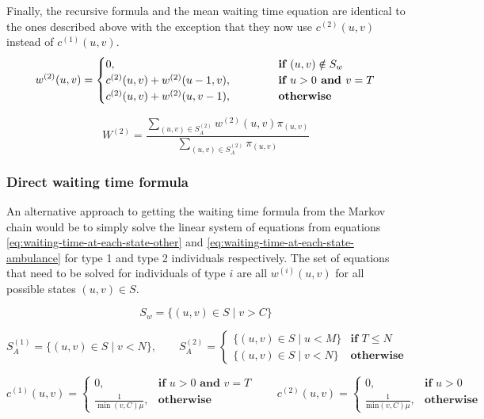 Finally, the recursive formula and the mean waiting time equation are identical 
to the ones described above with the exception that they now use \(c^{(2)}(u,v)\) 
instead of \(c^{(1)}(u,v)\).
\begin{equation} \label{eq:waiting-time-at-each-state-ambulance}
    w^{(2)}(u,v) = 
    \begin{cases} 
        0, \hspace{4.85cm} & \textbf{if } (u,v) \notin S_w \\
        c^{(2)}(u,v) + w^{(2)}(u-1, v), & \textbf{if } u > 0 \textbf{ and } v = T \\
        c^{(2)}(u,v) + w^{(2)}(u, v-1), & \textbf{otherwise}
    \end{cases}
\end{equation}

\begin{equation}\label{eq:recursive-waiting-time-ambulance}
    W^{(2)} = \frac{\sum_{(u,v) \in S_A^{(2)}} w^{(2)}(u,v) \pi_{(u,v)}}
    {\sum_{(u,v) \in S_A^{(2)}} \pi_{(u,v)}}
\end{equation}


\subsubsection{Direct waiting time formula}
An alternative approach to getting the waiting time formula from the Markov
chain would be to simply solve the linear system of equations from equations
\ref{eq:waiting-time-at-each-state-other} and
\ref{eq:waiting-time-at-each-state-ambulance} for type 1 and type 2 individuals
respectively.
The set of equations that need to be solved for individuals of type \(i\) are
all \( w^{(i)}(u, v) \) for all possible states \((u,v) \in S\).

\begin{equation*}
    S_w = \{(u, v) \in S \; | \; v > C \}
\end{equation*}

\begin{equation*}
    S_A^{(1)} = \{(u, v) \in S \; | \; v < N \},
    \qquad
    S_A^{(2)}=
    \begin{cases}
        \{(u, v) \in S \; | \; u < M \} & \textbf{if } T \leq N \\
        \{(u, v) \in S \; | \; v < N \} & \textbf{otherwise}
    \end{cases}
\end{equation*}


\begin{equation*}
    c^{(1)}(u,v) = 
    \begin{cases}
        0, & \textbf{if } u > 0 \textbf{ and } v = T \\
        \frac{1}{\min(v,C) \mu}, & \textbf{otherwise}
    \end{cases}
    \qquad
    c^{(2)}(u,v) = 
    \begin{cases}
        0, & \textbf{if } u > 0 \\
        \frac{1}{\text{min}(v,C)\mu}, & \textbf{otherwise}
    \end{cases}
\end{equation*}


